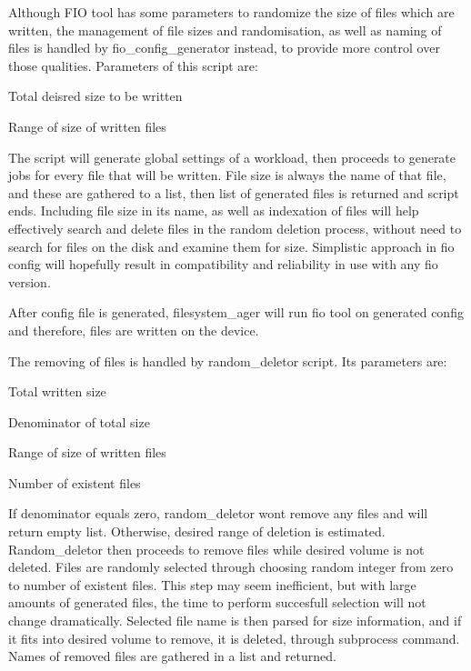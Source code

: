 \documentclass[
  color, %
  table, %
  lof,   %
  lot,   %
]{fithesis3}
\begin{document}
Although FIO tool has some parameters to randomize the size of files which are written, the management of file sizes and randomisation, as well as naming of files is handled by fio\_config\_generator instead, to provide more control over those qualities.
Parameters of this script are:
\begin{compactenum}
  \item Total deisred size to be written
  \item Range of size of written files
\end{compactenum}

The script will generate global settings of a workload, then proceeds to generate jobs for every file that will be written. File size is always the name of that file, and these are gathered to a list, then list of generated files is returned and script ends. Including file size in its name, as well as indexation of files will help effectively search and delete files in the random deletion process, without need to search for files on the disk and examine them for size. Simplistic approach in fio config will hopefully result in compatibility and reliability in use with any fio version.

After config file is generated, filesystem\_ager will run fio tool on generated config and therefore, files are written on the device.

The removing of files is handled by random\_deletor script. Its parameters are:
\begin{compactenum}
  \item Total written size
  \item Denominator of total size
  \item Range of size of written files
  \item Number of existent files
\end{compactenum}

If denominator equals zero, random\_deletor wont remove any files and will return empty list. Otherwise, desired range of deletion is estimated. Random\_deletor then proceeds to remove files while desired volume is not deleted. Files are randomly selected through choosing random integer from zero to number of existent files. This step may seem inefficient, but with large amounts of generated files, the time to perform succesfull selection will not change dramatically. Selected file name is then parsed for size information, and if it fits into desired volume to remove, it is deleted, through subprocess command. Names of removed files are gathered in a list and returned.
\end{document}
